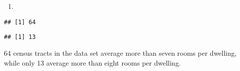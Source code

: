 \documentclass[
]{article}
\newenvironment{Shaded}{\begin{snugshade}}{\end{snugshade}}
\newcommand{\DecValTok}[1]{\textcolor[rgb]{0.00,0.00,0.81}{#1}}
\newcommand{\FunctionTok}[1]{\textcolor[rgb]{0.13,0.29,0.53}{\textbf{#1}}}
\newcommand{\NormalTok}[1]{#1}
\newcommand{\SpecialCharTok}[1]{\textcolor[rgb]{0.81,0.36,0.00}{\textbf{#1}}}
\providecommand{\tightlist}{%
  \setlength{\itemsep}{0pt}\setlength{\parskip}{0pt}}
\begin{document}
\begin{enumerate}
\def\labelenumi{(\alph{enumi})}
\setcounter{enumi}{7}
\tightlist
\item
\end{enumerate}

\begin{Shaded}
\end{Shaded}

\begin{verbatim}
## [1] 64
\end{verbatim}

\begin{Shaded}
\end{Shaded}

\begin{verbatim}
## [1] 13
\end{verbatim}

64 census tracts in the data set average more than seven rooms per
dwelling, while only 13 average more than eight rooms per dwelling.
\end{document}
